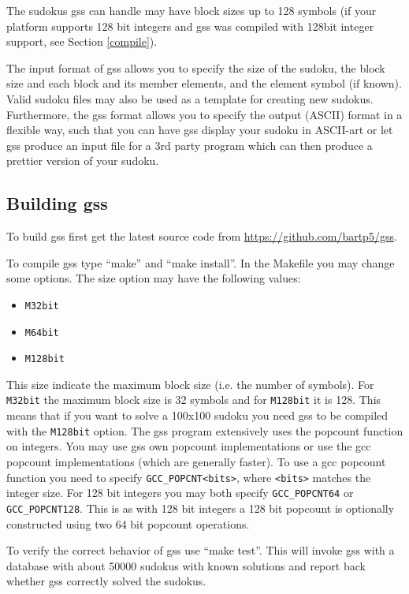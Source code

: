 \documentclass[12pt]{article}
\begin{document}
The sudokus gss can handle may have block sizes up to 128 symbols (if your platform supports 128 bit integers and gss was compiled with 128bit integer support, see Section \ref{compile}).

The input format of gss allows you to specify the size of the sudoku, the block size and each block and its member elements, and the element symbol (if known). Valid sudoku files may also be used as a template for creating new sudokus. Furthermore, the gss format allows you to specify the output (ASCII) format in a flexible way, such that you can have gss display your sudoku in ASCII-art or let gss produce an input file for a 3rd party program which can then produce a prettier version of your sudoku.

\subsection{\label{compile}Building gss}
To build gss first get the latest source code from \url{https://github.com/bartp5/gss}.

To compile gss type ``make'' and ``make install''. In the Makefile you may change some options. The size option may have the following values:
\begin{itemize}
	\item{} \verb-M32bit-
	\item{} \verb-M64bit-
	\item{} \verb-M128bit-
\end{itemize}
This size indicate the maximum block size (i.e. the number of symbols). For \verb-M32bit- the maximum block size is 32 symbols and for \verb-M128bit- it is 128. This means that if you want to solve a 100x100 sudoku you need gss to be compiled with the \verb-M128bit- option. The gss program extensively uses the popcount function on integers. You may use gss own popcount implementations or use the gcc popcount implementations (which are generally faster). To use a gcc popcount function you need to specify \verb-GCC_POPCNT<bits>-, where \verb-<bits>- matches the integer size. For 128 bit integers you may both specify \verb-GCC_POPCNT64- or \verb-GCC_POPCNT128-. This is as with 128 bit integers a 128 bit popcount is optionally constructed using two 64 bit popcount operations.

To verify the correct behavior of gss use ``make test''. This will invoke gss with a database with about 50000 sudokus with known solutions and report back whether gss correctly solved the sudokus. 
\end{document}
